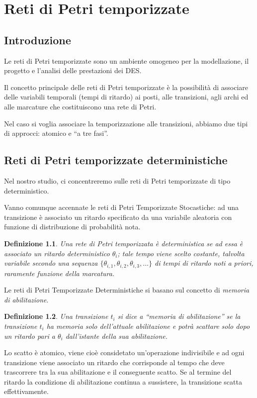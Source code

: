 \documentclass[a4paper]{report}
\newtheorem{definizione}{Definizione}
\begin{document}
\chapter{Reti di Petri temporizzate}
\section{Introduzione}
Le reti di Petri temporizzate sono un ambiente omogeneo per la
modellazione, il progetto e l'analisi delle prestazioni dei DES.

Il concetto principale delle reti di Petri temporizzate \`e la
possibilit\`a di associare delle variabili temporali (tempi di
ritardo) ai posti, alle transizioni, agli archi ed alle marcature che
costituiscono una rete di Petri.

Nel caso si voglia associare la temporizzazione alle transizioni,
abbiamo due tipi di approcci: atomico e ``a tre fasi''.
\section{Reti di Petri temporizzate deterministiche}
Nel nostro studio, ci concentreremo sulle reti di Petri temporizzate
di tipo deterministico.

Vanno comunque accennate le reti di Petri Temporizzate Stocastiche: ad
una transizione \`e associato un ritardo specificato da una variabile
aleatoria con funzione di distribuzione di probabilit\`a nota.

\begin{definizione}\label{def:reteDiPetriTemporizzataDeterministica}
Una rete di Petri temporizzata \`e deterministica se ad essa \`e
associato un ritardo deterministico $\theta_i$; tale tempo viene
scelto {\em costante}, talvolta {\em variabile} secondo una sequenza
$\{ \theta_{i,1},\theta_{i,2},\theta_{i,3}, ... \}$ di tempi di ritardo noti
a priori, raramente funzione della marcatura.
\end{definizione}

Le reti di Petri Temporizzate Deterministiche si basano sul concetto
di {\em memoria di abilitazione}.
\begin{definizione}
Una transizione $t_i$ si dice a ``memoria di abilitazione'' se la
transizione $t_i$ ha memoria solo dell'attuale abilitazione e potr\`a
scattare solo dopo un ritardo pari a $\theta_i$ dall'istante della sua
abilitazione.
\end{definizione}
Lo scatto \`e atomico, viene cio\`e considetato un'operazione
indivisibile e ad ogni transizione viene associato un ritardo che
corrisponde al tempo che deve trascorrere tra la sua abilitazione e il
conseguente scatto. Se al termine del ritardo la condizione di
abilitazione continua a sussistere, la transizione scatta
effettivamente. 
\end{document}
